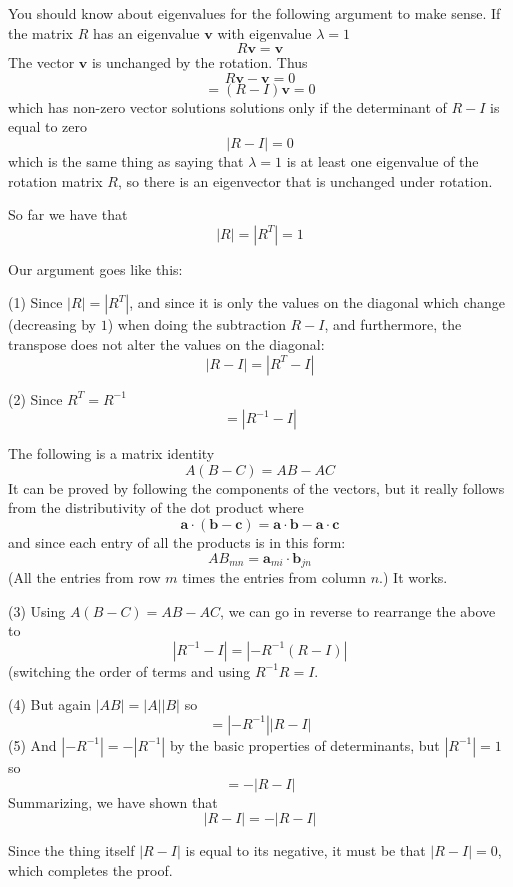 \documentclass[11pt, oneside]{article}
\begin{document}
You should know about  eigenvalues for the following argument to make sense.  If the matrix $R$ has an eigenvalue $\mathbf{v}$ with eigenvalue $\lambda = 1$
\[ R \mathbf{v} = \mathbf{v} \]
The vector $\mathbf{v}$ is unchanged by the rotation.
Thus 
\[ R \mathbf{v} - \mathbf{v} = 0 \]
\[ = (R - I) \mathbf{v} = 0 \]
which has non-zero vector solutions solutions only if the determinant of $R-I$ is equal to zero
\[ |R - I | = 0 \]
which is the same thing as saying that $\lambda = 1$ is at least one eigenvalue of the rotation matrix $R$, so there is an eigenvector that is unchanged under rotation.

So far we have that
\[ |R| = |R^T| = 1 \]

Our argument goes like this:

(1) Since $|R| = |R^T|$, and since it is only the values on the diagonal which change (decreasing by $1$) when doing the subtraction $R-I$, and furthermore, the transpose does not alter the values on the diagonal:
\[ |R-I| = |R^T - I| \]

(2) Since $R^T = R^{-1}$
\[ = |R^{-1} - I| \]

The following is a matrix identity
\[ A(B-C) = AB - AC \] 
It can be proved by following the components of the vectors, but it really follows from the distributivity of the dot product where
\[ \mathbf{a} \cdot (\mathbf{b} - \mathbf{c}) = \mathbf{a} \cdot \mathbf{b} - \mathbf{a} \cdot \mathbf{c} \]
and since each entry of all the products is in this form:
\[ AB_{mn} = \mathbf{a}_{mi} \cdot \mathbf{b}_{jn} \]
(All the entries from row $m$ times the entries from column $n$.)
It works.

(3) Using $A(B-C) = AB - AC$, we can go in reverse to rearrange the above to
\[ |R^{-1} - I| = |-R^{-1}(R - I)| \]
(switching the order of terms and using $R^{-1} R = I$.

(4) But again $|AB| = |A| |B|$ so
\[ = |-R^{-1} | |R-I| \]
(5) And $ | -R^{-1}| = -| R^{-1} | $ by the basic properties of determinants, but $|R^{-1}| = 1$ so
\[ = - | R-I | \]
Summarizing, we have shown that
\[ |R-I| = - |R-I| \]

Since the thing itself $|R-I|$ is equal to its negative, it must be that $|R-I| = 0$, which completes the proof.
\end{document}
